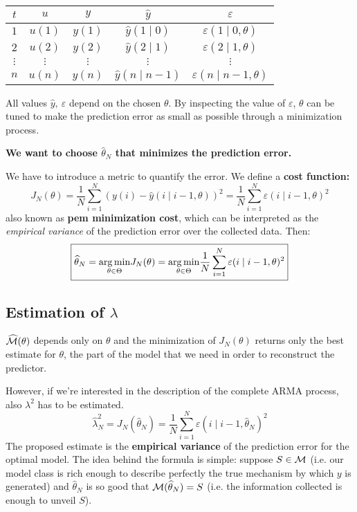 \begin{center}
\begin{tabular}{ccccc}
\toprule 
 $t$ & $u$ & $y$ & $ \hat{y}$ & $ \varepsilon $ \\
\midrule 
 $1$ & $ u(1)$ & $ y(1)$ & $ \hat{y}(1\mid 0)$ & $ \varepsilon (1\mid 0,\theta)$ \\
$2$ & $ u(2)$ & $ y(2)$ & $ \hat{y}(2\mid 1)$ & $ \varepsilon (2\mid 1,\theta)$ \\
$ \vdots $ & $ \vdots $ & $ \vdots $ & $ \vdots $ & $ \vdots $ \\
$n$ & $ u(n)$ & $ y(n)$ & $ \hat{y}(n\mid n-1)$ & $ \varepsilon (n\mid n-1,\theta)$ \\
 \bottomrule
\end{tabular}
\end{center}
\vspace{0.5cm}
All values $ \hat{y} ,\ \varepsilon $ depend on the chosen $ \theta $. By inspecting the value of $ \varepsilon $, $ \theta $ can be tuned to make the prediction error as small as possible through a minimization process.

\textbf{We want to choose $\hat{\theta}_{N}$ that minimizes the prediction error.}

We have to introduce a metric to quantify the error. We define a \textbf{cost function:} 
\begin{equation*}
	\boxed{J_{N}(\theta) =\frac{1}{N}\sum _{i=1}^{N}(y(i) -\hat{y}(i\mid i-1,\theta))^{2} =\frac{1}{N}\sum _{i=1}^{N} \varepsilon (i\mid i-1,\theta)^{2}}
\end{equation*}
also known as \textbf{\gls{pem} minimization cost}, which can be interpreted as the \emph{empirical variance} of the prediction error over the collected data. Then:
\[
	\boxed{\widehat{\theta }_{N} =\underset{\theta \in \Theta}{\operatorname*{arg\,min}} J_{N}(\theta) =\underset{\theta \in \Theta}{\operatorname*{arg\,min}}\frac{1}{N}\sum _{i=1}^{N} \varepsilon (i\mid i-1,\theta)^{2}}
\]

\subsection{Estimation of \texorpdfstring{$\lambda$}{lambda}}

$ \widehat{\mathcal{M}}(\theta)$ depends only on $ \theta $ and the minimization of $J_{N}(\theta)$ returns only the best estimate for $\theta$, the part of the model that we need in order to reconstruct the predictor.

However, if we're interested in the description of the complete ARMA process, also $\lambda^{2}$ has to be estimated. 
\begin{equation*}
	\boxed{\hat{\lambda }_{N}^{2} =J_{N}(\hat{\theta }_{N}) =\frac{1}{N}\sum _{i=1}^{N} \varepsilon (i\mid i-1,\hat{\theta }_{N})^{2}}
\end{equation*}
The proposed estimate is the \textbf{empirical variance} of the prediction error for the optimal model. The idea behind the formula is simple: suppose $ S\in \mathcal{M} $ (i.e. our model class is rich enough to describe perfectly the true mechanism by which $y$ is generated) and $\hat{\theta }_{N}$ is so good that $\mathcal{M}(\widehat{\theta }_{N}) =S$ (i.e. the information collected is enough to unveil $S$).

